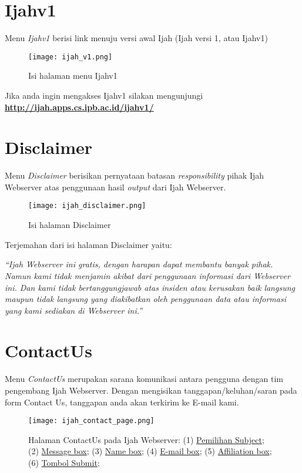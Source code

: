 \section{Ijahv1}
Menu \emph{Ijahv1} berisi link menuju versi awal Ijah (Ijah versi 1, atau Ijahv1)

\begin{figure}[H]
	\centering
	\texttt{[image: ijah\_v1.png]}
	\caption{Isi halaman menu Ijahv1}
	\label{fig:ijah_v1}
\end{figure}

Jika anda ingin mengakses Ijahv1 silakan mengunjungi \href{http://ijah.apps.cs.ipb.ac.id/ijahv1/}{\textbf{http://ijah.apps.cs.ipb.ac.id/ijahv1/}}

\section{Disclaimer}

Menu \emph{Disclaimer} berisikan pernyataan batasan \emph{responsibility} pihak Ijah Webserver atas penggunaan hasil \emph{output} dari Ijah Webserver.

\begin{figure}[H]
	\centering
	\texttt{[image: ijah\_disclaimer.png]}
	\caption{Isi halaman Disclaimer}
	\label{fig:ijah_disclaimer}
\end{figure}

Terjemahan dari isi halaman Disclaimer yaitu:

\textit{``Ijah Webserver ini gratis, dengan harapan dapat membantu banyak pihak. Namun kami tidak menjamin akibat dari penggunaan informasi dari Webserver ini. Dan kami tidak bertanggungjawab atas insiden atau kerusakan baik langsung maupun tidak langsung yang diakibatkan oleh penggunaan data atau informasi yang kami sediakan di Webserver ini.''}


\section{ContactUs} \label{ContactUs}

Menu \emph{ContactUs} merupakan sarana komunikasi antara pengguna dengan tim pengembang Ijah Webserver. Dengan mengisikan tanggapan/keluhan/saran pada form Contact Us, tanggapan anda akan terkirim ke E-mail kami.

\begin{figure}[H]
	\centering
	\texttt{[image: ijah\_contact\_page.png]}
	\caption{Halaman ContactUs pada Ijah Webserver:
	(1) \hyperref[subject]{Pemilihan Subject};
	(2) \hyperref[message]{Message box};
	(3) \hyperref[personal data]{Name box};
	(4) \hyperref[personal data]{E-mail box};
	(5) \hyperref[personal data]{Affiliation box};
	(6) \hyperref[submit]{Tombol Submit};
	}
	\label{fig:ijah_contact_page}
\end{figure}

